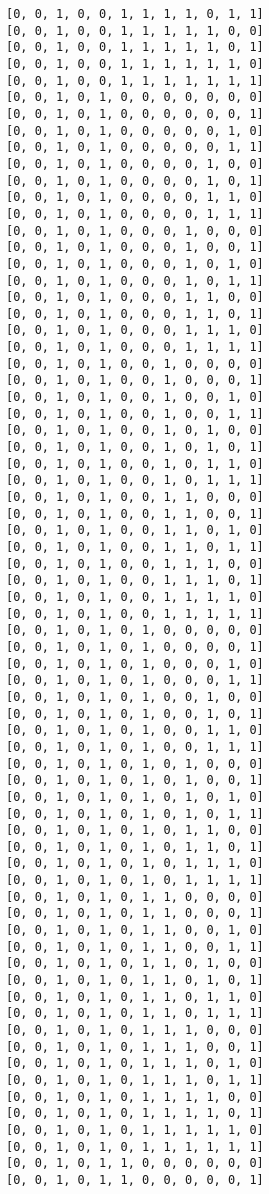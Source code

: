 \documentclass[11pt]{article}
\begin{document}
\begin{Verbatim}[commandchars=\\\{\}]
[0, 0, 1, 0, 0, 1, 1, 1, 1, 0, 1, 1]
[0, 0, 1, 0, 0, 1, 1, 1, 1, 1, 0, 0]
[0, 0, 1, 0, 0, 1, 1, 1, 1, 1, 0, 1]
[0, 0, 1, 0, 0, 1, 1, 1, 1, 1, 1, 0]
[0, 0, 1, 0, 0, 1, 1, 1, 1, 1, 1, 1]
[0, 0, 1, 0, 1, 0, 0, 0, 0, 0, 0, 0]
[0, 0, 1, 0, 1, 0, 0, 0, 0, 0, 0, 1]
[0, 0, 1, 0, 1, 0, 0, 0, 0, 0, 1, 0]
[0, 0, 1, 0, 1, 0, 0, 0, 0, 0, 1, 1]
[0, 0, 1, 0, 1, 0, 0, 0, 0, 1, 0, 0]
[0, 0, 1, 0, 1, 0, 0, 0, 0, 1, 0, 1]
[0, 0, 1, 0, 1, 0, 0, 0, 0, 1, 1, 0]
[0, 0, 1, 0, 1, 0, 0, 0, 0, 1, 1, 1]
[0, 0, 1, 0, 1, 0, 0, 0, 1, 0, 0, 0]
[0, 0, 1, 0, 1, 0, 0, 0, 1, 0, 0, 1]
[0, 0, 1, 0, 1, 0, 0, 0, 1, 0, 1, 0]
[0, 0, 1, 0, 1, 0, 0, 0, 1, 0, 1, 1]
[0, 0, 1, 0, 1, 0, 0, 0, 1, 1, 0, 0]
[0, 0, 1, 0, 1, 0, 0, 0, 1, 1, 0, 1]
[0, 0, 1, 0, 1, 0, 0, 0, 1, 1, 1, 0]
[0, 0, 1, 0, 1, 0, 0, 0, 1, 1, 1, 1]
[0, 0, 1, 0, 1, 0, 0, 1, 0, 0, 0, 0]
[0, 0, 1, 0, 1, 0, 0, 1, 0, 0, 0, 1]
[0, 0, 1, 0, 1, 0, 0, 1, 0, 0, 1, 0]
[0, 0, 1, 0, 1, 0, 0, 1, 0, 0, 1, 1]
[0, 0, 1, 0, 1, 0, 0, 1, 0, 1, 0, 0]
[0, 0, 1, 0, 1, 0, 0, 1, 0, 1, 0, 1]
[0, 0, 1, 0, 1, 0, 0, 1, 0, 1, 1, 0]
[0, 0, 1, 0, 1, 0, 0, 1, 0, 1, 1, 1]
[0, 0, 1, 0, 1, 0, 0, 1, 1, 0, 0, 0]
[0, 0, 1, 0, 1, 0, 0, 1, 1, 0, 0, 1]
[0, 0, 1, 0, 1, 0, 0, 1, 1, 0, 1, 0]
[0, 0, 1, 0, 1, 0, 0, 1, 1, 0, 1, 1]
[0, 0, 1, 0, 1, 0, 0, 1, 1, 1, 0, 0]
[0, 0, 1, 0, 1, 0, 0, 1, 1, 1, 0, 1]
[0, 0, 1, 0, 1, 0, 0, 1, 1, 1, 1, 0]
[0, 0, 1, 0, 1, 0, 0, 1, 1, 1, 1, 1]
[0, 0, 1, 0, 1, 0, 1, 0, 0, 0, 0, 0]
[0, 0, 1, 0, 1, 0, 1, 0, 0, 0, 0, 1]
[0, 0, 1, 0, 1, 0, 1, 0, 0, 0, 1, 0]
[0, 0, 1, 0, 1, 0, 1, 0, 0, 0, 1, 1]
[0, 0, 1, 0, 1, 0, 1, 0, 0, 1, 0, 0]
[0, 0, 1, 0, 1, 0, 1, 0, 0, 1, 0, 1]
[0, 0, 1, 0, 1, 0, 1, 0, 0, 1, 1, 0]
[0, 0, 1, 0, 1, 0, 1, 0, 0, 1, 1, 1]
[0, 0, 1, 0, 1, 0, 1, 0, 1, 0, 0, 0]
[0, 0, 1, 0, 1, 0, 1, 0, 1, 0, 0, 1]
[0, 0, 1, 0, 1, 0, 1, 0, 1, 0, 1, 0]
[0, 0, 1, 0, 1, 0, 1, 0, 1, 0, 1, 1]
[0, 0, 1, 0, 1, 0, 1, 0, 1, 1, 0, 0]
[0, 0, 1, 0, 1, 0, 1, 0, 1, 1, 0, 1]
[0, 0, 1, 0, 1, 0, 1, 0, 1, 1, 1, 0]
[0, 0, 1, 0, 1, 0, 1, 0, 1, 1, 1, 1]
[0, 0, 1, 0, 1, 0, 1, 1, 0, 0, 0, 0]
[0, 0, 1, 0, 1, 0, 1, 1, 0, 0, 0, 1]
[0, 0, 1, 0, 1, 0, 1, 1, 0, 0, 1, 0]
[0, 0, 1, 0, 1, 0, 1, 1, 0, 0, 1, 1]
[0, 0, 1, 0, 1, 0, 1, 1, 0, 1, 0, 0]
[0, 0, 1, 0, 1, 0, 1, 1, 0, 1, 0, 1]
[0, 0, 1, 0, 1, 0, 1, 1, 0, 1, 1, 0]
[0, 0, 1, 0, 1, 0, 1, 1, 0, 1, 1, 1]
[0, 0, 1, 0, 1, 0, 1, 1, 1, 0, 0, 0]
[0, 0, 1, 0, 1, 0, 1, 1, 1, 0, 0, 1]
[0, 0, 1, 0, 1, 0, 1, 1, 1, 0, 1, 0]
[0, 0, 1, 0, 1, 0, 1, 1, 1, 0, 1, 1]
[0, 0, 1, 0, 1, 0, 1, 1, 1, 1, 0, 0]
[0, 0, 1, 0, 1, 0, 1, 1, 1, 1, 0, 1]
[0, 0, 1, 0, 1, 0, 1, 1, 1, 1, 1, 0]
[0, 0, 1, 0, 1, 0, 1, 1, 1, 1, 1, 1]
[0, 0, 1, 0, 1, 1, 0, 0, 0, 0, 0, 0]
[0, 0, 1, 0, 1, 1, 0, 0, 0, 0, 0, 1]

\end{Verbatim}
\end{document}
